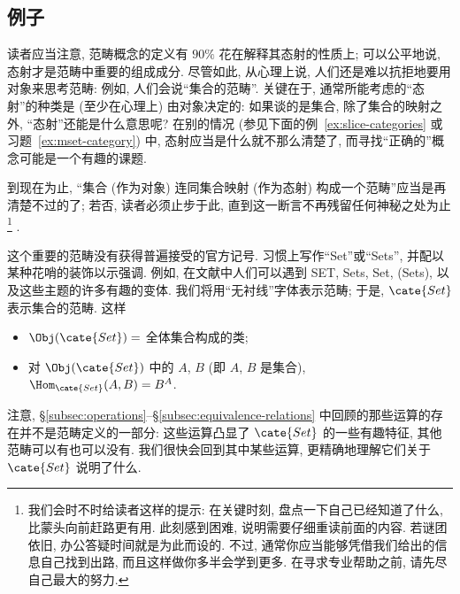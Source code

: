 \subsection{例子}
\label{subsec:categories-ex}

读者应当注意, 范畴概念的定义有 $90\%$ 花在解释其态射的性质上; 可以公平地说, 态射才是范畴中重要的组成成分. 尽管如此, 从心理上说, 人们还是难以抗拒地要用对象来思考范畴: 例如, 人们会说``集合的范畴''. 关键在于, 通常所能考虑的``态射''的种类是 (至少在心理上) 由对象决定的: 如果谈的是集合, 除了集合的映射之外, ``态射''还能是什么意思呢? 在别的情况 (参见下面的例~\ref{ex:slice-categories} 或习题~\ref{ex:mset-category}) 中, 态射应当是什么就不那么清楚了, 而寻找``正确的''概念可能是一个有趣的课题.

\begin{example}
\label{ex:set-category}
到现在为止, ``集合 (作为对象) 连同集合映射 (作为态射) 构成一个范畴''应当是再清楚不过的了; 若否, 读者必须止步于此, 直到这一断言不再残留任何神秘之处为止%
\footnote{我们会时不时给读者这样的提示: 在关键时刻, 盘点一下自己已经知道了什么, 比蒙头向前赶路更有用. 此刻感到困难, 说明需要仔细重读前面的内容. 若谜团依旧, 办公答疑时间就是为此而设的. 不过, 通常你应当能够凭借我们给出的信息自己找到出路, 而且这样做你多半会学到更多. 在寻求专业帮助之前, 请先尽自己最大的努力.}%
.

这个重要的范畴没有获得普遍接受的官方记号. 习惯上写作``Set''或``Sets'', 并配以某种花哨的装饰以示强调. 例如, 在文献中人们可以遇到 SET, Sets, Set, (Sets), 以及这些主题的许多有趣的变体. 我们将用``无衬线''字体表示范畴; 于是, $\cate{Set}$ 表示集合的范畴. 这样
\begin{itemize}
	\item $\Obj(\cate{Set}) =$ 全体集合构成的类;
	\item 对 $\Obj(\cate{Set})$ 中的 $A$, $B$ (即 $A$, $B$ 是集合), $\Hom_{\cate{Set}}(A, B) = B^A$.
\end{itemize}
注意, \S\ref{subsec:operations}--\S\ref{subsec:equivalence-relations} 中回顾的那些运算的存在并不是范畴定义的一部分: 这些运算凸显了 $\cate{Set}$ 的一些有趣特征, 其他范畴可以有也可以没有. 我们很快会回到其中某些运算, 更精确地理解它们关于 $\cate{Set}$ 说明了什么.
\end{example}

